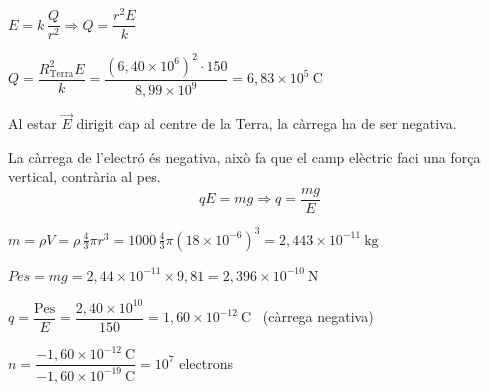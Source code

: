 \begin{solapartat}
 $E = k\,\dfrac{Q}{r^2} \Rightarrow Q = \dfrac{r^2 E}{k}$

 $Q = \dfrac{R^2_\mathrm{Terra}E}{k} = \dfrac{\left(6,40\times 10^{6}\right)^2\cdot 150}{8,99\times 10^{9}} = 6,83\times 10^{5}\ \mathrm{C}$ 

 Al estar $\vec{E}$ dirigit cap al centre de la Terra, la càrrega ha de ser negativa.
\end{solapartat}

\begin{solapartat}
 La càrrega de l'electró és negativa, això fa que el camp elèctric faci una força vertical, contrària al pes.
\[ qE = mg \Rightarrow q = \frac{mg}{E} \]

 $m = \rho V = \rho\,\frac{4}{3}\pi r^3 = 1000\,\frac{4}{3}\pi\left(18\times 10^{-6}\right)^3 = 2,443\times 10^{-11}\ \mathrm{kg}$

 $\mathit{Pes} = mg = 2,44\times 10^{-11}\times 9,81 = 2,396\times 10^{-10}\ \mathrm{N}$

 $q = \dfrac{\mathrm{Pes}}{E} = \dfrac{2,40\times 10^{10}}{150} = 1,60\times 10^{-12}\ \mathrm{C}$ \ (càrrega negativa)

 $n = \dfrac{-1,60\times 10^{-12}\ \mathrm{C}}{-1,60\times 10^{-19}\ \mathrm{C}} = 10^{7}$ electrons
\end{solapartat}
